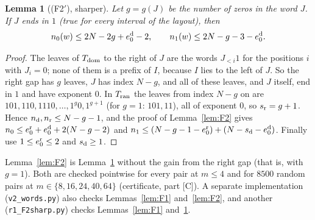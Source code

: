 \documentclass[11pt]{article}
\newtheorem{lemma}[theorem]{Lemma}
\theoremstyle{definition}
\theoremstyle{remark}
\begin{document}
\begin{lemma}[(F2$'$), sharper]\label{lem:F2sharp}
Let $g=g(J)$ be the number of zeros in the word $J$. If $J$ ends in $1$ (true for every interval
of the layout), then
\[ n_0(w)\le 2N-2g+e^{\rm d}_0-2,\qquad n_1(w)\le 2N-g-3-e^{\rm d}_0 .\]
\end{lemma}
\begin{proof}
The leaves of $T_{\rm dom}$ to the right of $J$ are the words $J_{<i}1$ for the positions $i$ with
$J_i=0$; none of them is a prefix of $I$, because $I$ lies to the left of $J$. So the right gap has
$g$ leaves, $J$ has index $N-g$, and all of these leaves, and $J$ itself, end in $1$ and have
exponent $0$. In $T_{\rm ran}$ the leaves from index $N-g$ on are $101,110,1110,\dots,1^{g}0,1^{g+1}$ (for $g=1$: $101,11$),
all of exponent $0$, so $s_{\rm r}=g+1$. Hence $n_{\rm d},n_{\rm r}\le N-g-1$, and the proof of
Lemma~\ref{lem:F2} gives $n_0\le e_0^{\rm r}+e_0^{\rm d}+2(N-g-2)$ and
$n_1\le(N-g-1-e_0^{\rm r})+(N-s_{\rm d}-e_0^{\rm d})$. Finally use $1\le e_0^{\rm r}\le2$ and
$s_{\rm d}\ge1$.
\end{proof}

Lemma~\ref{lem:F2} is Lemma~\ref{lem:F2sharp} without the gain from the right gap (that is,
with $g=1$). Both are checked pointwise for every pair at $m\le4$ and for $8500$ random pairs at
$m\in\{8,16,24,40,64\}$ (certificate, part [C]). A separate implementation
(\texttt{v2\_words.py}) also checks Lemmas~\ref{lem:F1} and~\ref{lem:F2}, and another
(\texttt{r1\_F2sharp.py}) checks Lemmas~\ref{lem:F1} and~\ref{lem:F2sharp}.
\end{document}
